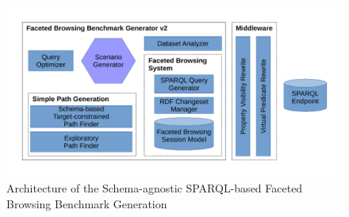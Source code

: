 \begin{figure}
\centering
\includegraphics[width=\textwidth]{images/Architecture}
\caption{Architecture of the Schema-agnostic SPARQL-based Faceted Browsing Benchmark Generation\label{fig:architecture}}
\end{figure}

